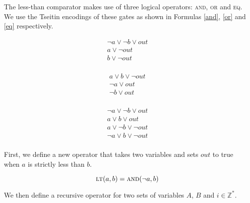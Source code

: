 \documentclass{article}
\begin{document}
The less-than comparator makes use of three logical operators: \textsc{and},
\textsc{or} and \textsc{eq}. We use the Tseitin
encodings\cite{prestwich2009cnf} of these gates as shown in Formulas \ref{and},
\ref{or} and \ref{eq} respectively.

\begin{multicols}{3}
  \begin{equation}
    \label{and}
    \begin{split}
      \neg{a} \lor \neg{b} \lor \mathit{out} \\
      a \lor \neg{\mathit{out}} \\
      b \lor \neg{\mathit{out}} \\
    \end{split}
  \end{equation}\break

  \begin{equation}
    \label{or}
    \begin{split}
      a \lor b \lor \neg{\mathit{out}} \\
      \neg{a} \lor \mathit{out} \\
      \neg{b} \lor \mathit{out} \\
    \end{split}
  \end{equation}\break

  \begin{equation}
    \label{eq}
    \begin{split}
      \neg{a} \lor \neg{b} \lor \mathit{out} \\
      a \lor b \lor \mathit{out} \\
      a \lor \neg{b} \lor \neg{\mathit{out}} \\
      \neg{a} \lor b \lor \neg{\mathit{out}} \\
    \end{split}
  \end{equation}\break
\end{multicols}

\noindent First, we define a new operator that takes two variables and sets
$out$ to true when $a$ is strictly less than $b$.

\begin{equation}
  \textsc{lt}(a, b) = \textsc{and}(\neg{a}, b)
\end{equation}\break

\noindent We then define a recursive operator for two sets of variables $A$,
$B$ and $i \in \mathbb{Z}^*$.
\end{document}
